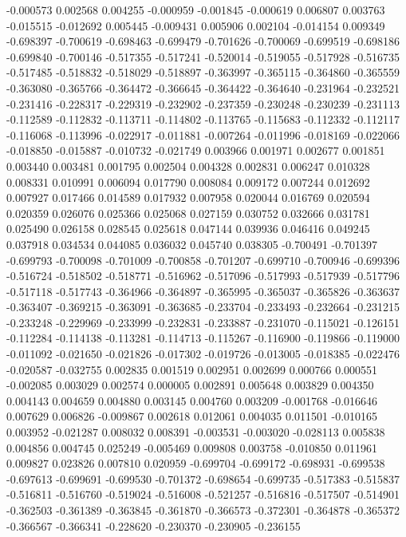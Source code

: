-0.000573
0.002568
0.004255
-0.000959
-0.001845
-0.000619
0.006807
0.003763
-0.015515
-0.012692
0.005445
-0.009431
0.005906
0.002104
-0.014154
0.009349
-0.698397
-0.700619
-0.698463
-0.699479
-0.701626
-0.700069
-0.699519
-0.698186
-0.699840
-0.700146
-0.517355
-0.517241
-0.520014
-0.519055
-0.517928
-0.516735
-0.517485
-0.518832
-0.518029
-0.518897
-0.363997
-0.365115
-0.364860
-0.365559
-0.363080
-0.365766
-0.364472
-0.366645
-0.364422
-0.364640
-0.231964
-0.232521
-0.231416
-0.228317
-0.229319
-0.232902
-0.237359
-0.230248
-0.230239
-0.231113
-0.112589
-0.112832
-0.113711
-0.114802
-0.113765
-0.115683
-0.112332
-0.112117
-0.116068
-0.113996
-0.022917
-0.011881
-0.007264
-0.011996
-0.018169
-0.022066
-0.018850
-0.015887
-0.010732
-0.021749
0.003966
0.001971
0.002677
0.001851
0.003440
0.003481
0.001795
0.002504
0.004328
0.002831
0.006247
0.010328
0.008331
0.010991
0.006094
0.017790
0.008084
0.009172
0.007244
0.012692
0.007927
0.017466
0.014589
0.017932
0.007958
0.020044
0.016769
0.020594
0.020359
0.026076
0.025366
0.025068
0.027159
0.030752
0.032666
0.031781
0.025490
0.026158
0.028545
0.025618
0.047144
0.039936
0.046416
0.049245
0.037918
0.034534
0.044085
0.036032
0.045740
0.038305
-0.700491
-0.701397
-0.699793
-0.700098
-0.701009
-0.700858
-0.701207
-0.699710
-0.700946
-0.699396
-0.516724
-0.518502
-0.518771
-0.516962
-0.517096
-0.517993
-0.517939
-0.517796
-0.517118
-0.517743
-0.364966
-0.364897
-0.365995
-0.365037
-0.365826
-0.363637
-0.363407
-0.369215
-0.363091
-0.363685
-0.233704
-0.233493
-0.232664
-0.231215
-0.233248
-0.229969
-0.233999
-0.232831
-0.233887
-0.231070
-0.115021
-0.126151
-0.112284
-0.114138
-0.113281
-0.114713
-0.115267
-0.116900
-0.119866
-0.119000
-0.011092
-0.021650
-0.021826
-0.017302
-0.019726
-0.013005
-0.018385
-0.022476
-0.020587
-0.032755
0.002835
0.001519
0.002951
0.002699
0.000766
0.000551
-0.002085
0.003029
0.002574
0.000005
0.002891
0.005648
0.003829
0.004350
0.004143
0.004659
0.004880
0.003145
0.004760
0.003209
-0.001768
-0.016646
0.007629
0.006826
-0.009867
0.002618
0.012061
0.004035
0.011501
-0.010165
0.003952
-0.021287
0.008032
0.008391
-0.003531
-0.003020
-0.028113
0.005838
0.004856
0.004745
0.025249
-0.005469
0.009808
0.003758
-0.010850
0.011961
0.009827
0.023826
0.007810
0.020959
-0.699704
-0.699172
-0.698931
-0.699538
-0.697613
-0.699691
-0.699530
-0.701372
-0.698654
-0.699735
-0.517383
-0.515837
-0.516811
-0.516760
-0.519024
-0.516008
-0.521257
-0.516816
-0.517507
-0.514901
-0.362503
-0.361389
-0.363845
-0.361870
-0.366573
-0.372301
-0.364878
-0.365372
-0.366567
-0.366341
-0.228620
-0.230370
-0.230905
-0.236155

